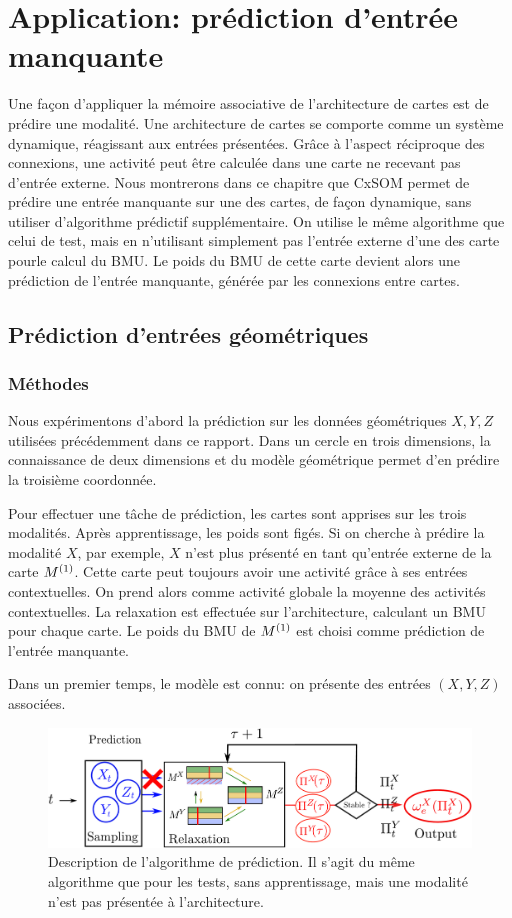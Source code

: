 \chapter{Application: prédiction d'entrée manquante}
\graphicspath{{05-Application/}}
\minitoc

Une façon d'appliquer la mémoire associative de l'architecture de cartes est de prédire une modalité. Une architecture de cartes se comporte comme un système dynamique, réagissant aux entrées présentées. Grâce à l'aspect réciproque des connexions, une activité peut être calculée dans une carte ne recevant pas d'entrée externe. Nous montrerons dans ce chapitre que CxSOM permet de prédire une entrée manquante sur une des cartes, de façon dynamique, sans utiliser d'algorithme prédictif supplémentaire. On utilise le même algorithme que celui de test, mais en n'utilisant simplement pas l'entrée externe d'une des carte pourle calcul du BMU. Le poids du BMU de cette carte devient alors une prédiction de l'entrée manquante, générée par les connexions entre cartes.

\section{Prédiction d'entrées géométriques}

\subsection{Méthodes}
Nous expérimentons d'abord la prédiction sur les données géométriques $X,Y,Z$ utilisées précédemment dans ce rapport. Dans un cercle en trois dimensions, la connaissance de deux dimensions et du modèle géométrique permet d'en prédire la troisième coordonnée.

Pour effectuer une tâche de prédiction, les cartes sont apprises sur les trois modalités. Après apprentissage, les poids sont figés. Si on cherche à prédire la modalité $X$, par exemple, $X$ n'est plus présenté en tant qu'entrée externe de la carte $M^{({1})}$. Cette carte peut toujours avoir une activité grâce à ses entrées contextuelles. On prend alors comme activité globale la moyenne des activités contextuelles. La relaxation est effectuée sur l'architecture, calculant un BMU pour chaque carte. Le poids du BMU de $M^{({1})}$ est choisi comme prédiction de l'entrée manquante.

Dans un premier temps, le modèle est connu: on présente des entrées $(X,Y,Z)$ associées.


\begin{figure}
\centering
\includegraphics[width=\textwidth]{prediction_setup}
\caption{Description de l'algorithme de prédiction. Il s'agit du même algorithme que pour les tests, sans apprentissage, mais une modalité n'est pas présentée à l'architecture.}
\label{fig:schema}
\end{figure}


